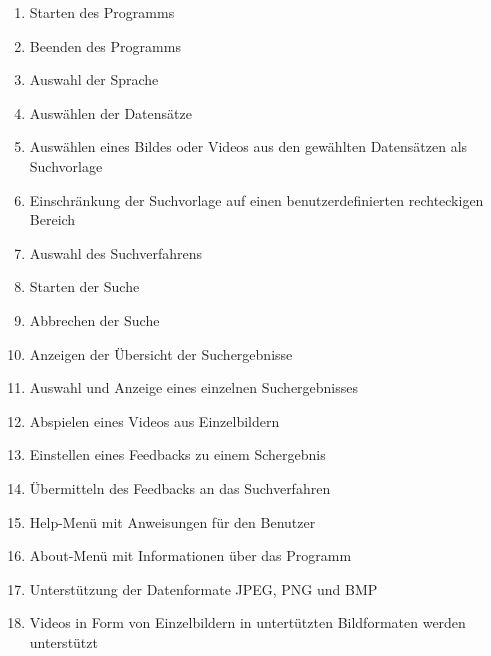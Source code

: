 \begin{enumerate} [label=\bfseries /F \arabic*0/]
	\subsection{Pflicht}
	\item Starten des Programms
	\item Beenden des Programms
	\item Auswahl der Sprache
	\item Ausw\"ahlen der Datens\"atze
	\item Ausw\"ahlen eines Bildes oder Videos aus den gewählten Datensätzen als Suchvorlage
	\item Einschränkung der Suchvorlage auf einen benutzerdefinierten rechteckigen Bereich
	\item Auswahl des Suchverfahrens
	\item Starten der Suche
	\item Abbrechen der Suche
	\item Anzeigen der \"Ubersicht der Suchergebnisse
	\item Auswahl und Anzeige eines einzelnen Suchergebnisses
	\item Abspielen eines Videos aus Einzelbildern
	\item Einstellen eines Feedbacks zu einem Schergebnis
	\item \"Ubermitteln des Feedbacks an das Suchverfahren
	\item Help-Menü mit Anweisungen für den Benutzer
	\item About-Menü mit Informationen über das Programm
	\item Unterstützung der Datenformate JPEG, PNG und BMP
	\item Videos in Form von Einzelbildern in untert\"utzten Bildformaten werden unterst\"utzt

\end{enumerate}
